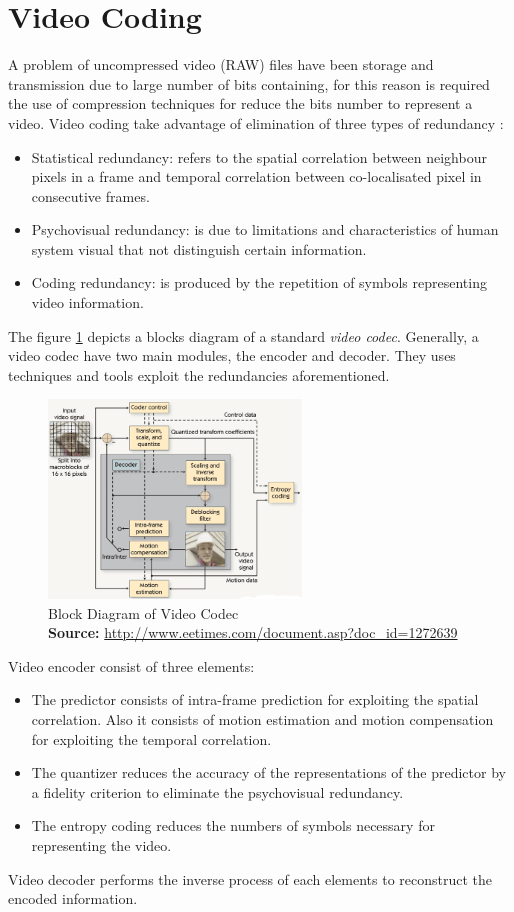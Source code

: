 \section{Video Coding}
A problem of uncompressed video (RAW) files have been storage and transmission due to large number of bits containing, for this reason is required the use of compression techniques for reduce the bits number to represent a video. Video coding take advantage of elimination of three types of redundancy \cite{motion}:
\begin{itemize}
	\item Statistical redundancy: refers to the spatial correlation between neighbour pixels in a frame and temporal correlation between co-localisated pixel in consecutive frames.
	\item Psychovisual redundancy: is due to limitations and characteristics of human system visual that not distinguish certain information.
	\item Coding redundancy: is produced by the repetition of symbols representing video information.
\end{itemize}
	
The figure \ref{codec} depicts a blocks diagram of a standard \emph{video codec}. Generally, a video codec have  two main modules, the encoder and decoder. They uses techniques and tools exploit the redundancies aforementioned. 

\begin{figure}[!h]
\centering
\includegraphics[width=0.6\textwidth]{images/codec}
\caption[Block Diagram of Video Codec]{Block Diagram of Video Codec \\
\scriptsize{\textbf{Source:} \url{http://www.eetimes.com/document.asp?doc_id=1272639}}}
\label{codec}
\end{figure}

Video encoder consist of three elements:
\begin{itemize}
	\item The predictor consists of intra-frame prediction for exploiting the spatial correlation. Also it consists of motion estimation and motion compensation for exploiting the temporal correlation. 
	\item The quantizer reduces the accuracy of the representations of the predictor by a fidelity criterion to eliminate the psychovisual redundancy.
	\item The entropy coding reduces the numbers of symbols necessary for representing the video.
\end{itemize}

Video decoder performs the inverse process of each elements to reconstruct the encoded information.







